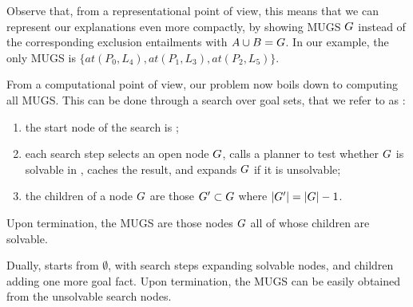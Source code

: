 %
%
%
%

Observe that, from a representational point of view, this means that
we can represent our explanations even more compactly, by showing MUGS
$G$ instead of the corresponding exclusion entailments with $A
\cup B = G$. In our example, the only MUGS is $\{at(P_0,L_4),
at(P_1,L_3), at(P_2,L_5)\}$.

From a computational point of view, our problem now boils down to
computing all MUGS. This can be done through a search over goal sets,
that we refer to as :
\begin{enumerate}[(1)]
\item the start node of the search is \goal; 
\item each search step selects an open node $G$, calls a planner
  to test whether $G$ is solvable in \task, caches the result,
  and expands $G$ if it is unsolvable;
\item the children of a node $G$ are those $G' \subset
  G$ where $|G'| = |G|-1$.
\end{enumerate}
Upon termination, the MUGS are those nodes $G$ all of whose
children are solvable. 

Dually,  starts from
$\emptyset$, with search steps expanding solvable nodes, and children
adding one more goal fact. Upon termination, the MUGS can be easily
obtained from the unsolvable search nodes.

